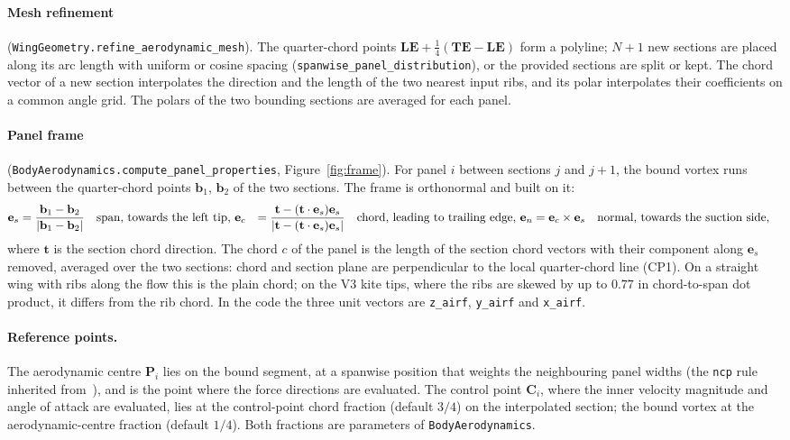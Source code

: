 \documentclass[11pt,a4paper]{article}
\newcommand{\vect}[1]{\mathbf{#1}}
\newcommand{\code}[1]{\texttt{#1}}
\begin{document}
\paragraph{Mesh refinement} (\code{WingGeometry.refine\_aerodynamic\_mesh}). The quarter-chord points $\vect{LE}+\tfrac14(\vect{TE}-\vect{LE})$ form a polyline; $N+1$ new sections are placed along its arc length with uniform or cosine spacing (\code{spanwise\_panel\_distribution}), or the provided sections are split or kept. The chord vector of a new section interpolates the direction and the length of the two nearest input ribs, and its polar interpolates their coefficients on a common angle grid. The polars of the two bounding sections are averaged for each panel.

\paragraph{Panel frame} (\code{BodyAerodynamics.compute\_panel\_properties}, Figure~\ref{fig:frame}). For panel $i$ between sections $j$ and $j+1$, the bound vortex runs between the quarter-chord points $\vect b_1$, $\vect b_2$ of the two sections. The frame is orthonormal and built on it:
\begin{align}
\vect e_{s}&=\frac{\vect b_1-\vect b_2}{|\vect b_1-\vect b_2|} &&\text{span, towards the left tip,}\notag\
\vect e_{c}&=\frac{\vect t-(\vect t\cdot\vect e_s)\vect e_s}{|\vect t-(\vect t\cdot\vect e_s)\vect e_s|} &&\text{chord, leading to trailing edge,}\
\vect e_{n}&=\vect e_c\times\vect e_s &&\text{normal, towards the suction side,}\notag
\end{align}
where $\vect t$ is the section chord direction. The chord $c$ of the panel is the length of the section chord vectors with their component along $\vect e_s$ removed, averaged over the two sections: chord and section plane are perpendicular to the local quarter-chord line (CP1). On a straight wing with ribs along the flow this is the plain chord; on the V3 kite tips, where the ribs are skewed by up to $0.77$ in chord-to-span dot product, it differs from the rib chord. In the code the three unit vectors are \code{z\_airf}, \code{y\_airf} and \code{x\_airf}.

\paragraph{Reference points.} The aerodynamic centre $\vect P_i$ lies on the bound segment, at a spanwise position that weights the neighbouring panel widths (the \code{ncp} rule inherited from~\cite{damiani2019}), and is the point where the force directions are evaluated. The control point $\vect C_i$, where the inner velocity magnitude and angle of attack are evaluated, lies at the control-point chord fraction (default $3/4$) on the interpolated section; the bound vortex at the aerodynamic-centre fraction (default $1/4$). Both fractions are parameters of \code{BodyAerodynamics}.
\end{document}
